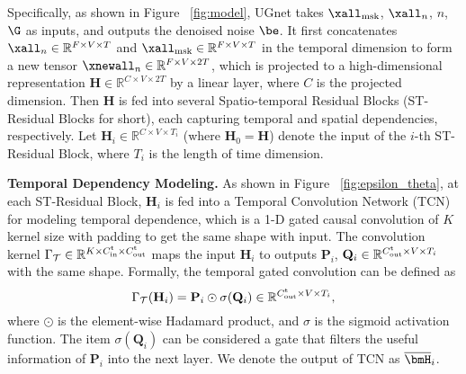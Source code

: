 {\par Specifically, as shown in Figure ~\ref{fig:model}, UGnet takes $\xall_{\rm msk}$, $\xall_{n}$, $n$, $\G$ as inputs, and outputs the denoised noise $\be$. It first concatenates $\xall_{n} \in \mathbb{R}^{F \times V \times T}$ and $\xall_{\rm msk} \in \mathbb{R}^{F \times V \times T}$ in the temporal dimension to form a new tensor $\xnewall_n \in \mathbb{R}^{F \times V \times 2T}$, which is projected to a high-dimensional representation ${\mathbf H} \in {\mathbb R}^{C \times V \times 2T}$ by a linear layer, where $C$ is the projected dimension. Then ${\mathbf H}$ is fed into several Spatio-temporal Residual Blocks (ST-Residual Blocks for short), each capturing temporal and spatial dependencies, respectively. Let ${\mathbf H}_i \in {\mathbb R}^{C \times V \times T_{i}}$ (where ${\mathbf H}_0={\mathbf{H}}$) denote the input of the $i$-th ST-Residual Block, where $T_{i}$ is the length of time dimension.

\par \textbf{Temporal Dependency Modeling.} As shown in Figure ~\ref{fig:epsilon_theta}, at each ST-Residual Block, ${\mathbf H}_i$ is fed into a Temporal Convolution Network (TCN) \cite{bai2018tcn} for modeling temporal dependence, which is a 1-D gated causal convolution of $K$ kernel size with padding to get the same shape with input.  The convolution kernel $\Gamma_{\mathcal T} \in \mathbb{R} ^ {K \times C_{\rm in}^{\rm t} \times C_{\rm out}^{\rm t}}$ maps the input $\mathbf{H}_i$ to outputs ${\mathbf P}_i$, ${\mathbf Q}_i \in \mathbb{R}^{C_{\rm out}^{\rm t} \times V \times T_{i}}$ with the same shape. Formally, the temporal gated convolution can be defined as
\begin{equation}
    \Gamma_{\mathcal T} ({\mathbf H}_{i})  =  {\mathbf P}_i \odot \sigma({\mathbf Q}_i) \in \mathbb{R} ^ {C_{\rm out}^{\rm t} \times V \times T_{i}},
\end{equation}
where $\odot$ is the element-wise Hadamard product, and $\sigma$ is the sigmoid activation function. The item $\sigma({\mathbf Q}_i) $ can be considered a gate that filters the useful information of ${\mathbf P}_i$ into the next layer. We denote the output of TCN as $\overline{\bmH}_i$.

}
